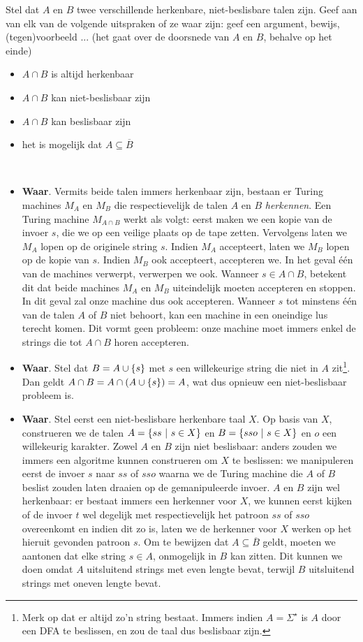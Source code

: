 \documentclass{article}
\begin{document}
\begin{question}[Beslisbaarheid]
Stel dat $A$ en $B$ twee verschillende herkenbare, niet-beslisbare talen zijn.
Geef aan van elk van de volgende uitspraken of ze waar zijn: geef een
argument, bewijs, (tegen)voorbeeld ... (het gaat over de doorsnede van $A$ en
$B$, behalve op het einde)
\begin{itemize}
\item $A \cap B$ is altijd herkenbaar
\item $A \cap B$ kan niet-beslisbaar zijn
\item $A \cap B$ kan beslisbaar zijn
\item het is mogelijk dat $A \subseteq \overline{B}$
\end{itemize}
\begin{answer}
~~
\begin{itemize}
 \item \textbf{Waar}. Vermits beide talen immers herkenbaar zijn, bestaan er Turing machines
 $M_A$ en $M_B$ die respectievelijk de talen $A$ en $B$ \emph{herkennen}. Een Turing
 machine $M_{A\cap B}$ werkt als volgt: eerst maken we een kopie van de invoer $s$, die we op
 een veilige plaats op de tape zetten.
 Vervolgens laten we $M_A$ lopen op de originele string $s$. Indien $M_A$ accepteert,
 laten we $M_B$ lopen op de kopie van $s$. Indien $M_B$ ook accepteert, accepteren we. In het
 geval \'e\'en van de machines verwerpt, verwerpen we ook. Wanneer $s\in A\cap B$, betekent dit dat
 beide machines $M_A$ en $M_B$ uiteindelijk moeten accepteren en stoppen. In dit geval zal onze machine
 dus ook accepteren. Wanneer $s$ tot minstens \'e\'en van de talen $A$ of $B$ niet behoort, kan een
 machine in een oneindige lus terecht komen. Dit vormt geen probleem: onze machine moet immers
 enkel de strings die tot $A\cap B$ horen accepteren.
 \item \textbf{Waar}. Stel dat $B=A\cup\left\{ s \right\}$ met $s$ een willekeurige string die niet in $A$ zit\footnote{Merk op dat er altijd zo'n string bestaat. Immers indien $A=\Sigma^{\star}$ is $A$ door een DFA te beslissen, en zou de taal dus beslisbaar zijn.}. Dan geldt $A\cap B=A\cap\left( A\cup\left\{ s \right\} \right)=A$, wat dus opnieuw een niet-beslisbaar probleem is.
 \item \textbf{Waar}. Stel eerst een niet-beslisbare herkenbare taal $X$. Op basis van $X$, construeren we de talen $A=\left\{ ss\ |\ s\in X \right\}$ en $B=\left\{ sso\ |\ s\in X \right\}$ en $o$ een willekeurig karakter. Zowel $A$ en $B$ zijn niet beslisbaar: anders zouden we immers een algoritme kunnen construeren om $X$ te beslissen: we manipuleren eerst de invoer $s$ naar $ss$ of $sso$ waarna we de Turing machine die $A$ of $B$ beslist zouden laten draaien op de gemanipuleerde invoer. $A$ en $B$ zijn wel herkenbaar: er bestaat immers een herkenner voor $X$, we kunnen eerst kijken of de invoer $t$ wel degelijk met respectievelijk het patroon $ss$ of $sso$ overeenkomt en indien dit zo is, laten we de herkenner voor $X$ werken op het hieruit gevonden patroon $s$. Om te bewijzen dat $A\subseteq\overline{B}$ geldt, moeten we aantonen dat elke string $s\in A$, onmogelijk in $B$ kan zitten. Dit kunnen we doen omdat $A$ uitsluitend strings met even lengte bevat, terwijl $B$ uitsluitend strings met oneven lengte bevat.

\end{itemize}
\end{answer}
\end{question}
\end{document}
